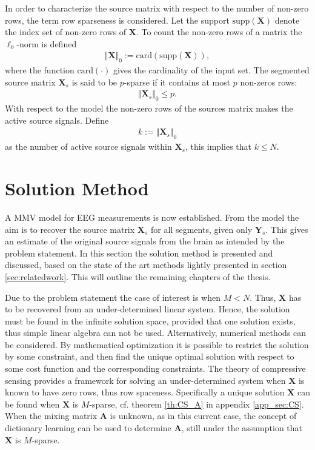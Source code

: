 In order to characterize the source matrix with respect to the number of non-zero rows, the term row sparseness is considered. 
Let the support $\text{supp}(\mathbf{X})$ denote the index set of non-zero rows of $\mathbf{X}$.
To count the non-zero rows of a matrix the $\ell_0$-norm is defined 
\begin{align*}
\Vert \mathbf{X} \Vert_0 := \text{card}(\text{supp}(\mathbf{X})),
\end{align*}
where the function $\text{card}(\cdot)$ gives the cardinality of the input set. The segmented source matrix $\textbf{X}_s$ is said to be $p$-sparse if it contains at most $p$ non-zeros rows:
\begin{align*}
\Vert \mathbf{X}_s \Vert_0 \leq p.
\end{align*}
With respect to the model the non-zero rows of the sources matrix makes the active source signals. Define  
\begin{align*}
k := \Vert \mathbf{X}_s \Vert_0
\end{align*} 
as the number of active source signals within $\textbf{X}_s$, this implies that $k\leq N$. 

\section{Solution Method}\label{sec:sol_met}
A MMV model for EEG measurements is now established.
From the model the aim is to recover the source matrix $\mathbf{X}_s$ for all segments, given only $\textbf{Y}_s$.
This gives an estimate of the original source signals from the brain as intended by the problem statement. 
In this section the solution method is presented and discussed, based on the state of the art methods lightly presented in section \ref{sec:relatedwork}. This will outline the remaining chapters of the thesis. 

Due to the problem statement the case of interest is when $M < N$.  
Thus, $\mathbf{X}$ has to be recovered from an under-determined linear system. 
Hence, the solution must be found in the infinite solution space, provided that one solution exists, thus simple linear algebra can not be used. 
Alternatively, numerical methods can be considered. By mathematical optimization it is possible to restrict the solution by some constraint, and then find the unique optimal solution with respect to some cost function and the corresponding constraints.
The theory of compressive sensing provides a framework for solving an under-determined system when $\mathbf{X}$ is known to have zero rows, thus row spareness. 
Specifically a unique solution $\mathbf{X}$ can be found when $\mathbf{X}$ is $M$-sparse, cf. theorem \ref{th:CS_A} in appendix \ref{app_sec:CS}. 
When the mixing matrix $\mathbf{A}$ is unknown, as in this current case, the concept of dictionary learning can be used to determine $\mathbf{A}$, still under the assumption that $\mathbf{X}$ is $M$-sparse.  

